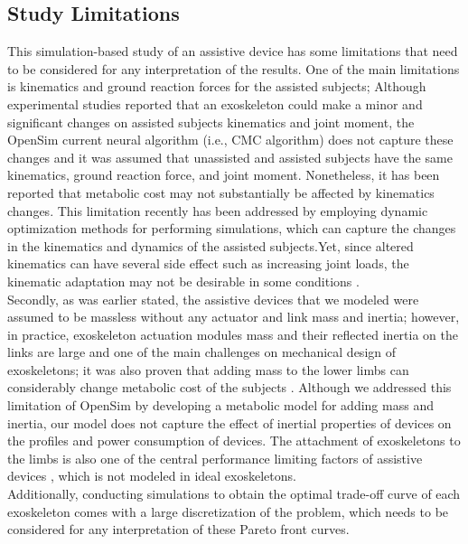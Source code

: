 \documentclass[10pt,letterpaper]{article}
\begin{document}
\subsection*{Study Limitations}
This simulation-based study of an assistive device has some limitations that need to be considered for any interpretation of the results. One of the main limitations is kinematics and ground reaction forces for the assisted subjects; Although experimental studies reported that an exoskeleton could make a minor \cite{42,79,91,114,115,116} and significant \cite{80,117,118,119} changes on assisted subjects kinematics and joint moment, the OpenSim current neural algorithm (i.e., CMC algorithm) does not capture these changes and it was assumed that unassisted and assisted subjects have the same kinematics, ground reaction force, and joint moment. Nonetheless, it has been reported that metabolic cost may not substantially be affected by kinematics changes\cite{120}. This limitation recently has been addressed by employing dynamic optimization methods for performing simulations, which can capture the changes in the kinematics and dynamics of the assisted subjects.Yet, since altered kinematics can have several side effect such as increasing joint loads, the kinematic adaptation may not be desirable in some conditions \cite{93}.\\  
Secondly, as was earlier stated, the assistive devices that we modeled were assumed to be massless without any actuator and link mass and inertia; however, in practice, exoskeleton actuation modules mass and their reflected inertia on the links are large and one of the main challenges on mechanical design of exoskeletons; it was also proven that adding mass to the lower limbs can considerably change metabolic cost of the subjects \cite{133}. Although we addressed this limitation of OpenSim by developing a metabolic model for adding mass and inertia, our model does not capture the effect of inertial properties of devices on the profiles and power consumption of devices. The attachment of exoskeletons to the limbs is also one of the central performance limiting factors of assistive devices \cite{121}, which is not modeled in ideal exoskeletons.\\
Additionally, conducting simulations to obtain the optimal trade-off curve of each exoskeleton comes with a large discretization of the problem, which needs to be considered for any interpretation of these Pareto front curves.
\end{document}

